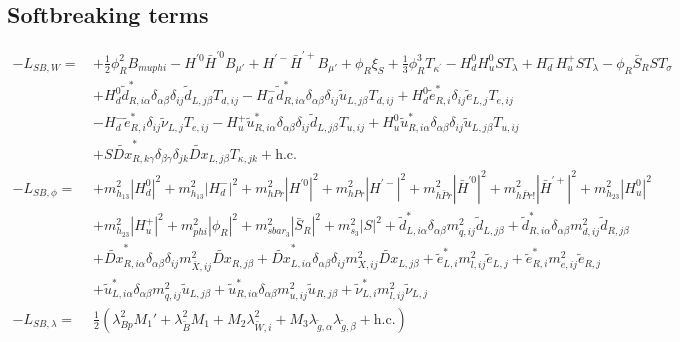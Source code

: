 \subsection{Softbreaking terms} 
\begin{align} 
- L_{SB,W} = \, & +\frac{1}{2} \phi_{R}^{2} B_{muphi} - H^{'0} \bar{H}^{'0} B_{\mu'} +H^{'-} \bar{H}^{'+} B_{\mu'} +\phi_R \xi_S +\frac{1}{3} \phi_{R}^{3} T_{\kappa^\prime} - H_d^0 H_u^0 S T_{\lambda} +H_d^- H_u^+ S T_{\lambda} - \phi_R \bar{S}_R S T_{\sigma} \nonumber \\ 
 &+H_d^0 \tilde{d}^*_{R,{i \alpha}} \delta_{\alpha \beta} \delta_{i j} \tilde{d}_{L,{j \beta}} T_{d,{i j}} - H_d^- \tilde{d}^*_{R,{i \alpha}} \delta_{\alpha \beta} \delta_{i j} \tilde{u}_{L,{j \beta}} T_{d,{i j}} +H_d^0 \tilde{e}^*_{R,{i}} \delta_{i j} \tilde{e}_{L,{j}} T_{e,{i j}} \nonumber \\ 
 &- H_d^- \tilde{e}^*_{R,{i}} \delta_{i j} \tilde{\nu}_{L,{j}} T_{e,{i j}} - H_u^+ \tilde{u}^*_{R,{i \alpha}} \delta_{\alpha \beta} \delta_{i j} \tilde{d}_{L,{j \beta}} T_{u,{i j}} +H_u^0 \tilde{u}^*_{R,{i \alpha}} \delta_{\alpha \beta} \delta_{i j} \tilde{u}_{L,{j \beta}} T_{u,{i j}} \nonumber \\ 
 &+S \tilde{Dx}^*_{R,{k \gamma}} \delta_{\beta \gamma} \delta_{j k} \tilde{Dx}_{L,{j \beta}} T_{\kappa,{j k}} + \mbox{h.c.} \\ 
- L_{SB,\phi} = \, & +m_{h_{13}}^2 |H_d^0|^2 +m_{h_{13}}^2 |H_d^-|^2 +m_{hPr}^2 |H^{'0}|^2 +m_{hPr}^2 |H^{'-}|^2 +m_{\bar{hPr}}^2 |\bar{H}^{'0}|^2 +m_{\bar{hPr!}}^2 |\bar{H}^{'+}|^2 +m_{h_{23}}^2 |H_u^0|^2 \nonumber \\ 
 &+m_{h_{23}}^2 |H_u^+|^2 +m_{phi}^2 |\phi_R|^2 +m_{sbar_3}^2 |\bar{S}_R|^2 +m_{s_3}^2 |S|^2 +\tilde{d}^*_{L,{i \alpha}} \delta_{\alpha \beta} m_{q,{i j}}^{2} \tilde{d}_{L,{j \beta}} +\tilde{d}^*_{R,{i \alpha}} \delta_{\alpha \beta} m_{d,{i j}}^{2} \tilde{d}_{R,{j \beta}} \nonumber \\ 
 &+\tilde{Dx}^*_{R,{i \alpha}} \delta_{\alpha \beta} \delta_{i j} m_{\bar{X},{i j}}^{2} \tilde{Dx}_{R,{j \beta}} +\tilde{Dx}^*_{L,{i \alpha}} \delta_{\alpha \beta} \delta_{i j} m_{X,{i j}}^{2} \tilde{Dx}_{L,{j \beta}} +\tilde{e}^*_{L,{i}} m_{l,{i j}}^{2} \tilde{e}_{L,{j}} +\tilde{e}^*_{R,{i}} m_{e,{i j}}^{2} \tilde{e}_{R,{j}} \nonumber \\ 
 &+\tilde{u}^*_{L,{i \alpha}} \delta_{\alpha \beta} m_{q,{i j}}^{2} \tilde{u}_{L,{j \beta}} +\tilde{u}^*_{R,{i \alpha}} \delta_{\alpha \beta} m_{u,{i j}}^{2} \tilde{u}_{R,{j \beta}} +\tilde{\nu}^*_{L,{i}} m_{l,{i j}}^{2} \tilde{\nu}_{L,{j}} \\ 
- L_{SB,\lambda} = \, & \frac{1}{2}\left(\lambda_{Bp}^{2} M_1'  + \lambda_{\tilde{B}}^{2} M_1  + M_2 \lambda_{{\tilde{W}},{i}}^{2}  + M_3 \lambda_{{\tilde{g}},{\alpha}} \lambda_{{\tilde{g}},{\beta}} + \mbox{h.c.} \right) 
\end{align} 
